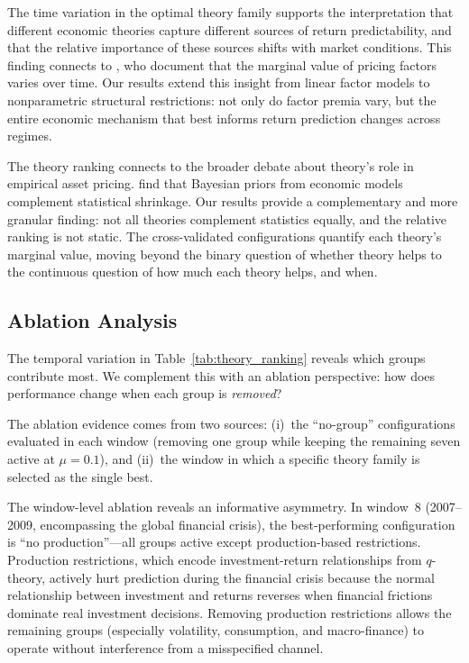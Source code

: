 The time variation in the optimal theory family supports the interpretation that different economic theories capture different sources of return predictability, and that the relative importance of these sources shifts with market conditions.
This finding connects to \citet{Bryzgalova2023bayesian}, who document that the marginal value of pricing factors varies over time.
Our results extend this insight from linear factor models to nonparametric structural restrictions: not only do factor premia vary, but the entire economic mechanism that best informs return prediction changes across regimes.

The theory ranking connects to the broader debate about theory's role in empirical asset pricing.
\citet{bianchi2024two} find that Bayesian priors from economic models complement statistical shrinkage.
Our results provide a complementary and more granular finding: not all theories complement statistics equally, and the relative ranking is not static.
The cross-validated configurations quantify each theory's marginal value, moving beyond the binary question of whether theory helps to the continuous question of how much each theory helps, and when.


\subsection{Ablation Analysis}\label{sub:ablation}

The temporal variation in Table~\ref{tab:theory_ranking} reveals which groups contribute most.
We complement this with an ablation perspective: how does performance change when each group is \emph{removed}?

The ablation evidence comes from two sources: (i)~the ``no-group'' configurations evaluated in each window (removing one group while keeping the remaining seven active at $\mu = 0.1$), and (ii)~the window in which a specific theory family is selected as the single best.

The window-level ablation reveals an informative asymmetry.
In window~8 (2007--2009, encompassing the global financial crisis), the best-performing configuration is ``no production''---all groups active except production-based restrictions.
Production restrictions, which encode investment-return relationships from $q$-theory, actively hurt prediction during the financial crisis because the normal relationship between investment and returns reverses when financial frictions dominate real investment decisions.
Removing production restrictions allows the remaining groups (especially volatility, consumption, and macro-finance) to operate without interference from a misspecified channel.


